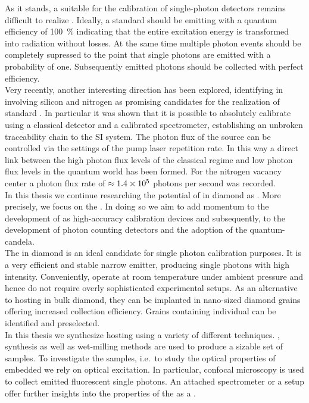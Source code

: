 	As it stands, a \sps suitable for the calibration of single-photon detectors remains difficult to realize \cite{Vaigu2017}. Ideally, a standard \sps should be emitting with a quantum efficiency of \SI{100}{\percent} indicating that the entire excitation energy is transformed into radiation without losses. At the same time multiple photon events should be completely supressed to the point that single photons are emitted with a probability of one. Subsequently emitted photons should be collected with perfect efficiency.
	\\
	Very recently, another interesting direction has been explored, identifying \ccs in \nds involving silicon \cite{Neu2012a, Neu2012b} and nitrogen \cite{doherty2013nitrogen} as promising candidates for the realization of standard \spss \cite{Rodiek2017,Vaigu2017}. In particular it was shown that it is possible to absolutely calibrate \spss using a classical detector and a calibrated spectrometer, establishing an unbroken traceability chain to the SI system. The photon flux of the source can be controlled via the settings of the pump laser repetition rate. In this way a direct link between the high photon flux levels of the classical regime and low photon flux levels in the quantum world has been formed. For the nitrogen vacancy center a photon flux rate of $\approx \num{1.4d5}$ photons per second was recorded.
	\\
	In this thesis we continue researching the potential of \ccs in diamond as \spss. More precisely, we focus on the \sivc. In doing so we aim to add momentum to the development of \sps as high-accuracy calibration devices and subsequently, to the development of photon counting detectors and the adoption of the quantum-candela.
	\\
	The \siv in diamond is an ideal candidate for single photon calibration purposes. It is a very efficient and stable narrow \lw emitter, producing single photons with high intensity. Conveniently, \sivs operate at room temperature under ambient pressure and hence do not require overly sophisticated experimental setups. As an alternative to hosting \sivs in bulk diamond, they can be implanted in nano-sized diamond grains offering increased collection efficiency. Grains containing individual \sivs can be identified and preselected.
	\\
	In this thesis we synthesize \nds hosting \sivs using a variety of different techniques. \Cvd, \hpht synthesis as well as wet-milling methods are used to produce a sizable set of samples. To investigate the samples, i.e.\ to study the optical properties of embedded \sivs we rely on optical excitation. In particular, confocal microscopy is used to collect emitted fluorescent single photons. An attached spectrometer or a \HBT setup offer further insights into the properties of the \siv as a \sps.
